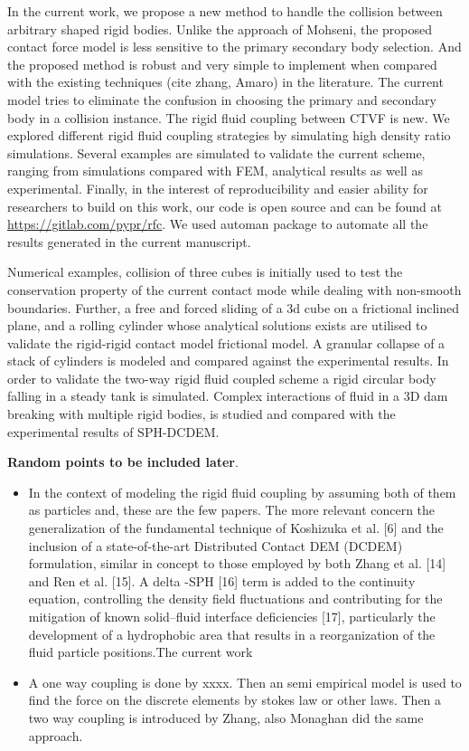 \documentclass[preprint,12pt]{elsarticle}
\begin{document}
In the current work, we propose a new method to handle the collision between
arbitrary shaped rigid bodies. Unlike the approach of Mohseni, the proposed
contact force model is less sensitive to the primary secondary body selection.
And the proposed method is robust and very simple to implement when compared
with the existing techniques (cite zhang, Amaro) in the literature. The
current model tries to eliminate the confusion in choosing the primary and
secondary body in a collision instance. The rigid fluid coupling between CTVF
is new. We explored different rigid fluid coupling strategies by simulating
high density ratio simulations. Several examples are simulated to validate the
current scheme, ranging from simulations compared with FEM, analytical results
as well as experimental. Finally, in the interest of reproducibility and
easier ability for researchers to build on this work, our code is open source
and can be found at \url{https://gitlab.com/pypr/rfc}. We used automan package
\cite{automan2018} to automate all the results generated in the current
manuscript.


Numerical examples, collision of three cubes is initially used to test the
conservation property of the current contact mode while dealing with
non-smooth boundaries. Further, a free and forced sliding of a 3d cube on a
frictional inclined plane, and a rolling cylinder whose analytical solutions
exists are utilised to validate the rigid-rigid contact model frictional
model. A granular collapse of a stack of cylinders is modeled and compared
against the experimental results. In order to validate the two-way rigid fluid
coupled scheme a rigid circular body falling in a steady tank is simulated.
Complex interactions of fluid in a 3D dam breaking with multiple rigid bodies,
is studied and compared with the experimental results of SPH-DCDEM.

\textbf{Random points to be included later}.
\begin{itemize}
\item In the context of modeling the rigid fluid coupling by assuming both of
  them as particles and, these are the few papers. The more relevant concern
  the generalization of the fundamental technique of Koshizuka et al. [6] and
  the inclusion of a state-of-the-art Distributed Contact DEM (DCDEM)
  formulation, similar in concept to those employed by both Zhang et al. [14]
  and Ren et al. [15]. A delta -SPH [16] term is added to the continuity equation,
  controlling the density field fluctuations and contributing for the
  mitigation of known solid–fluid interface deficiencies [17], particularly
  the development of a hydrophobic area that results in a reorganization of
  the fluid particle positions.The current work
\item A one way coupling is done by xxxx. Then an semi empirical model is used
  to find the force on the discrete elements by stokes law or other laws. Then
  a two way coupling is introduced by Zhang, also Monaghan did the same
  approach.
\end{itemize}
\end{document}
